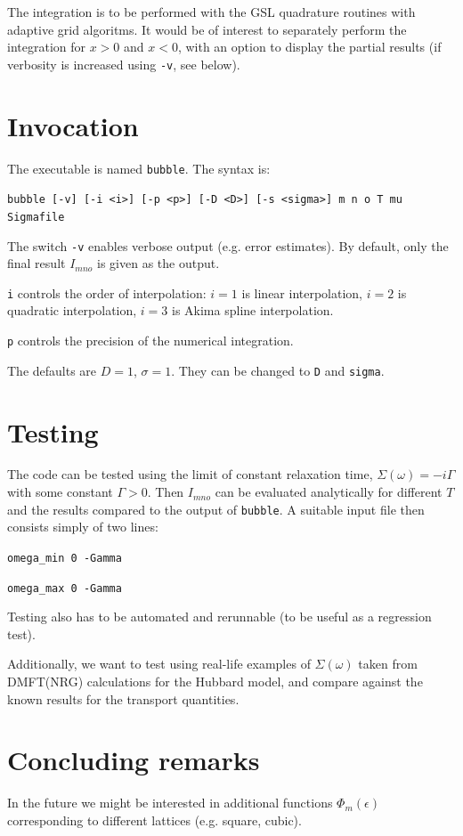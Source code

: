 \documentclass[prb,amsmath,amssymb,onecolumn,nopacs,floatfix,longbibliography]{revtex4-1}
\begin{document}
The integration is to be performed with the GSL quadrature routines
with adaptive grid algoritms. It would be of interest to separately
perform the integration for $x>0$ and $x<0$, with an option to display
the partial results (if verbosity is increased using {\tt -v}, see
below).


\section{Invocation}

The executable is named {\tt bubble}. The syntax is:

{\tt bubble [-v] [-i <i>] [-p <p>] [-D <D>] [-s <sigma>] 
m n o T mu Sigmafile}

The switch {\tt -v} enables verbose output (e.g. error estimates). By
default, only the final result $I_{mno}$ is given as the output.

{\tt i} controls the order of interpolation: $i=1$ is linear
interpolation, $i=2$ is quadratic interpolation, $i=3$ is Akima spline
interpolation.

{\tt p} controls the precision of the numerical integration.

The defaults are $D=1$, $\sigma=1$. They can be changed to
{\tt D} and {\tt sigma}.



\section{Testing}

The code can be tested using the limit of constant relaxation time,
$\Sigma(\omega)=-i\Gamma$ with some constant $\Gamma>0$. Then
$I_{mno}$ can be evaluated analytically for different $T$ and the
results compared to the output of {\tt bubble}. A suitable
input file then consists simply of two lines:

{\tt omega\_min 0 -Gamma}

{\tt omega\_max 0 -Gamma}

Testing also has to be automated and rerunnable (to be useful as
a regression test).

Additionally, we want to test using real-life examples of
$\Sigma(\omega)$ taken from DMFT(NRG) calculations for the Hubbard
model, and compare against the known results for the transport quantities.


\section{Concluding remarks}

In the future we might be interested in additional functions
$\Phi_m(\epsilon)$ corresponding to different lattices (e.g. square,
cubic).


\nocite{bevilacqua2013}


\end{document}
